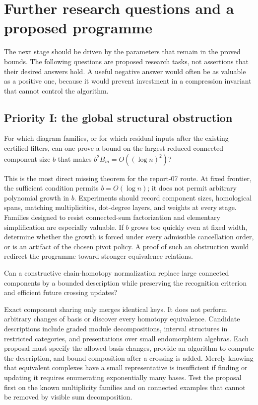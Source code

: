 \section{Further research questions and a proposed programme}
\label{sec:research}

The next stage should be driven by the parameters that remain in the
proved bounds. The following questions are proposed research tasks,
not assertions that their desired answers hold. A useful negative answer
would often be as valuable as a positive one, because it would prevent
investment in a compression invariant that cannot control the algorithm.

\subsection{Priority I: the global structural obstruction}

\begin{question}
\label{q:components}
For which diagram families, or for which residual inputs after the
existing certified filters, can one prove a bound on the largest reduced
connected component size $b$ that makes
$b^2 B_m=O((\log n)^2)$?
\end{question}
This is the most direct missing theorem for the report-07 route. At fixed
frontier, the sufficient condition permits $b=O(\log n)$; it does not
permit arbitrary polynomial growth in $b$. Experiments should record
component sizes, homological spans, matching multiplicities, dot-degree
layers, and weights at every stage. Families designed to resist
connected-sum factorization and elementary simplification are especially
valuable. If $b$ grows too quickly even at fixed width, determine whether
the growth is forced under every admissible cancellation order, or is
an artifact of the chosen pivot policy. A proof of such an obstruction
would redirect the programme toward stronger equivalence relations.

\begin{question}
Can a constructive chain-homotopy normalization replace large connected
components by a bounded description while preserving the recognition
criterion and efficient future crossing updates?
\end{question}
Exact component sharing only merges identical keys. It does not perform
arbitrary changes of basis or discover every homotopy equivalence.
Candidate descriptions include graded module decompositions, interval
structures in restricted categories, and presentations over small
endomorphism algebras. Each proposal must specify the allowed basis
changes, provide an algorithm to compute the description, and bound
composition after a crossing is added. Merely knowing that equivalent
complexes have a small representative is insufficient if finding or
updating it requires enumerating exponentially many bases. Test the
proposal first on the known multiplicity families and on connected
examples that cannot be removed by visible sum decomposition.


